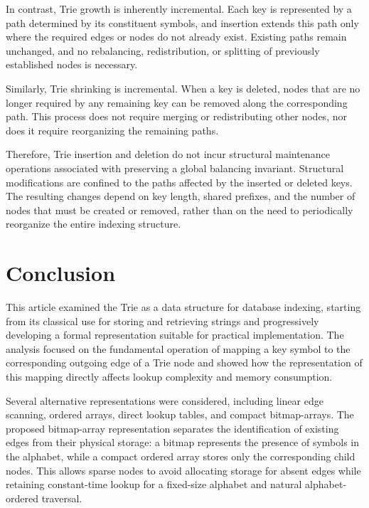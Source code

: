 \documentclass[11pt,twoside]{article}
\begin{document}
    In contrast, Trie growth is inherently incremental. Each key is represented by a path determined by its
    constituent symbols, and insertion extends this path only where the required edges or nodes do not already
    exist. Existing paths remain unchanged, and no rebalancing, redistribution, or splitting of previously
    established nodes is necessary.

    Similarly, Trie shrinking is incremental. When a key is deleted, nodes that are no longer required by any
    remaining key can be removed along the corresponding path. This process does not require merging or
    redistributing other nodes, nor does it require reorganizing the remaining paths.

    Therefore, Trie insertion and deletion do not incur structural maintenance operations associated with
    preserving a global balancing invariant. Structural modifications are confined to the paths affected by
    the inserted or deleted keys. The resulting changes depend on key length, shared prefixes, and the number
    of nodes that must be created or removed, rather than on the need to periodically reorganize the entire
    indexing structure.


    \section{Conclusion}
    \label{conclusion}

    This article examined the Trie as a data structure for database indexing, starting from its classical use for
    storing and retrieving strings and progressively developing a formal representation suitable for practical
    implementation. The analysis focused on the fundamental operation of mapping a key symbol to the corresponding
    outgoing edge of a Trie node and showed how the representation of this mapping directly affects lookup
    complexity and memory consumption.

    Several alternative representations were considered, including linear edge scanning, ordered arrays,
    direct lookup tables, and compact bitmap-arrays. The proposed bitmap-array representation separates the
    identification of existing edges from their physical storage: a bitmap represents the presence of symbols in the
    alphabet, while a compact ordered array stores only the corresponding child nodes. This allows sparse nodes to
    avoid allocating storage for absent edges while retaining constant-time lookup for a fixed-size alphabet
    and natural alphabet-ordered traversal.
\end{document}
